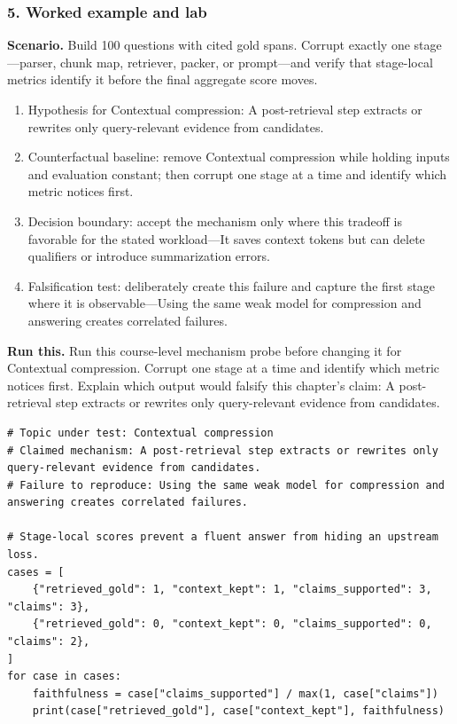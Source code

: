 \subsubsection*{5. Worked example and lab}
\textbf{Scenario.} Build 100 questions with cited gold spans. Corrupt exactly one stage—parser, chunk map, retriever, packer, or prompt—and verify that stage-local metrics identify it before the final aggregate score moves.
\begin{enumerate}
\item Hypothesis for Contextual compression: A post-retrieval step extracts or rewrites only query-relevant evidence from candidates.
\item Counterfactual baseline: remove Contextual compression while holding inputs and evaluation constant; then corrupt one stage at a time and identify which metric notices first.
\item Decision boundary: accept the mechanism only where this tradeoff is favorable for the stated workload—It saves context tokens but can delete qualifiers or introduce summarization errors.
\item Falsification test: deliberately create this failure and capture the first stage where it is observable—Using the same weak model for compression and answering creates correlated failures.
\end{enumerate}
\textbf{Run this.} Run this course-level mechanism probe before changing it for Contextual compression. Corrupt one stage at a time and identify which metric notices first. Explain which output would falsify this chapter's claim: A post-retrieval step extracts or rewrites only query-relevant evidence from candidates.
\begin{Verbatim}[fontsize=\scriptsize]
# Topic under test: Contextual compression
# Claimed mechanism: A post-retrieval step extracts or rewrites only query-relevant evidence from candidates.
# Failure to reproduce: Using the same weak model for compression and answering creates correlated failures.

# Stage-local scores prevent a fluent answer from hiding an upstream loss.
cases = [
    {"retrieved_gold": 1, "context_kept": 1, "claims_supported": 3, "claims": 3},
    {"retrieved_gold": 0, "context_kept": 0, "claims_supported": 0, "claims": 2},
]
for case in cases:
    faithfulness = case["claims_supported"] / max(1, case["claims"])
    print(case["retrieved_gold"], case["context_kept"], faithfulness)
\end{Verbatim}
